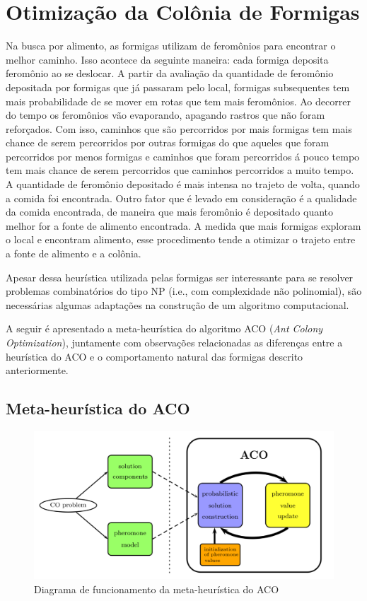 \section{Otimização da Colônia de Formigas}

Na busca por alimento, as formigas utilizam de feromônios para encontrar o melhor caminho.
Isso acontece da seguinte maneira: cada formiga deposita feromônio ao se deslocar. A partir
da avaliação da quantidade de feromônio depositada por formigas que já passaram pelo local,
formigas subsequentes tem mais probabilidade de se mover em rotas que tem mais feromônios. Ao
decorrer do tempo os feromônios vão evaporando, apagando rastros que não foram reforçados. 
Com isso, caminhos que são percorridos por mais formigas tem mais chance de serem 
percorridos por outras formigas do que aqueles que foram percorridos por menos formigas e 
caminhos que foram percorridos á pouco tempo tem mais chance de serem percorridos que caminhos
percorridos a muito tempo. A quantidade de feromônio depositado é mais intensa no trajeto de volta,
quando a comida foi encontrada. Outro fator que é levado em consideração é a qualidade da comida
encontrada, de maneira que mais feromônio é depositado quanto melhor for a fonte de alimento encontrada.
A medida que mais formigas exploram o local e encontram alimento, esse procedimento tende a otimizar o
trajeto entre a fonte de alimento e a colônia.

Apesar dessa heurística utilizada pelas formigas ser interessante para se resolver problemas combinatórios 
do tipo NP (i.e., com complexidade não polinomial), são necessárias algumas adaptações na construção
de um algoritmo computacional.

A seguir é apresentado a meta-heurística do algoritmo ACO (\textit{Ant Colony Optimization}),
juntamente com observações relacionadas as diferenças entre a heurística do ACO e o
comportamento natural das formigas descrito anteriormente.

\subsection{Meta-heurística do ACO}

\begin{figure}[ht]
  \includegraphics[width = 0.9 \linewidth]{imgs/meta_heuristica_aco}
  \caption{Diagrama de funcionamento da meta-heurística do ACO \cite{blum2005aco}}
  \label{diagrama_metaheuristica_aco}
\end{figure}

